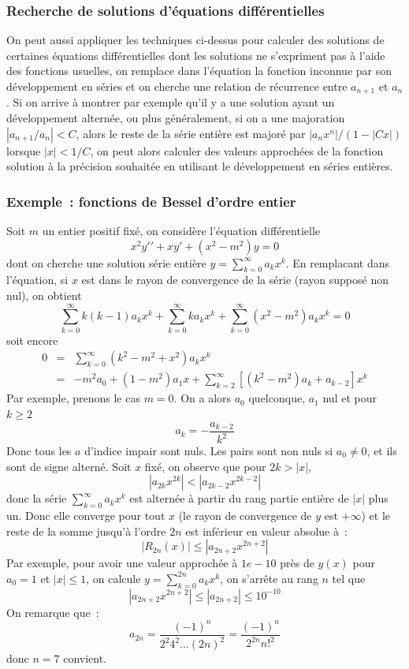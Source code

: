 \documentclass[a4paper,11pt]{article}
\begin{document}
\begin{giacjshere}
\subsubsection{Recherche de solutions d'\'equations diff\'erentielles}
On peut aussi appliquer les techniques ci-dessus pour calculer
des solutions de certaines \'equations diff\'erentielles dont les
solutions ne s'expriment pas \`a l'aide des fonctions usuelles,
on remplace dans l'\'equation la fonction inconnue par son 
d\'eveloppement en s\'eries et on cherche une relation de r\'ecurrence
entre $a_{n+1}$ et $a_n$. Si on arrive \`a montrer par exemple
qu'il y a une solution ayant un d\'eveloppement altern\'ee, 
ou plus g\'en\'eralement,
si on a une majoration $|a_{n+1}/a_n|<C$, alors le reste de la
s\'erie enti\`ere est major\'e par $|a_nx^n|/(1-|Cx|)$ lorsque
$|x|<1/C$, on peut alors calculer des valeurs approch\'ees
de la fonction solution \`a la pr\'ecision souhait\'ee en utilisant
le d\'eveloppement en s\'eries enti\`eres.

\subsubsection{Exemple~: fonctions de Bessel d'ordre entier}
Soit $m$ un entier positif fix\'e, on consid\`ere l'\'equation
diff\'erentielle
\[ x^2 y'{'} + x y' + (x^2-m^2)y=0 \]
dont on cherche une solution s\'erie enti\`ere 
$y=\sum_{k=0}^\infty a_k x^k $. En remplacant dans l'\'equation, si
$x$ est dans le rayon de convergence de la s\'erie (rayon suppos\'e
non nul), on obtient
\[ 
\sum_{k=0}^\infty k(k-1)a_k x^k + \sum_{k=0}^\infty k a_k x^k 
+ \sum_{k=0}^\infty (x^2-m^2) a_k x^k =0
\]
soit encore
\begin{eqnarray*}
0 &=& \sum_{k=0}^\infty (k^2-m^2+x^2) a_k x^k  \\
 &=& -m^2 a_0 + (1-m^2)a_1 x + \sum_{k=2}^\infty [(k^2-m^2) a_k +a_{k-2}]x^k 
\end{eqnarray*}
Par exemple, prenons le cas $m=0$. On a alors $a_0$ quelconque, $a_1$
nul et pour $k\geq 2$
\[ a_k = - \frac{a_{k-2}}{k^2}\]
Donc tous les $a$ d'indice impair sont nuls. Les pairs sont non nuls
si $a_0\neq 0$, et ils sont de signe altern\'e.
Soit $x$ fix\'e, on observe que pour $2k > |x|$,
\[ |a_{2k} x^{2k}| < |a_{2k-2} x^{2k-2}| \]
donc la s\'erie $\sum_{k=0}^\infty a_k x^k$ est altern\'ee \`a partir
du rang partie enti\`ere de $|x|$ plus un. Donc elle converge pour
tout $x$ (le rayon de convergence de $y$ est $+\infty$) 
et le reste de la somme jusqu'\`a l'ordre $2n$ est
inf\'erieur en valeur absolue \`a~:
\[ |R_{2n}(x)| \leq |a_{2n+2} x^{2n+2}| \]
Par exemple, pour avoir une valeur approch\'ee \`a $1e-10$ pr\`es de
$y(x)$ pour $a_0=1$ et $|x|\leq 1$, on calcule $y=\sum_{k=0}^{2n} a_k x^k $,
on s'arr\^ete au rang $n$ tel que 
\[ |a_{2n+2} x^{2n+2}| \leq |a_{2n+2}| \leq 10^{-10} \]
On remarque que~:
\[ a_{2n} = \frac{(-1)^n}{2^2 4^2 ... (2n)^2} = \frac{(-1)^n}{2^{2n} n!^2} \]
donc $n=7$ convient.


\end{giacjshere}
\end{document}
